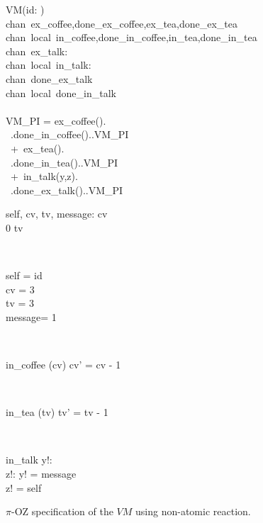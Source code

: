 \begin{figure}[H]
\centering
\begin{class}{VM(id: \integer)}
\ 
\\chan\ ex\_coffee,done\_ex\_coffee,ex\_tea,done\_ex\_tea
\ 
\\chan\ local\ in\_coffee,done\_in\_coffee,in\_tea,done\_in\_tea
\ 
\\chan\ ex\_talk:\integer \times \integer
\ 
\\chan\ local\ in\_talk:\integer \times \integer
\ 
\\chan\ done\_ex\_talk
\ 
\\chan\ local\ done\_in\_talk
\ \\ \
\\VM\_PI = ex\_coffee().
\\ \ \qquad \qquad \qquad .done\_in\_coffee()..VM\_PI 
\\ \ \qquad \qquad +\ ex\_tea().
\\ \ \qquad \qquad \qquad .done\_in\_tea()..VM\_PI 
\\ \ \qquad \qquad +\ in\_talk(y,z).
\\ \ \qquad \qquad \qquad .done\_ex\_talk()..VM\_PI
\\
\begin{state}
self, cv, tv, message: \integer
\ST
0 \leq  cv \leq 3
\\
0 \leq  tv \leq 3
\end{state} 
\\
\begin{init}
self = id
\\cv = 3
\\tv = 3
\\ message= 1
\end{init} 
\\
\begin{op}{in\_coffee}
\Delta (cv)
\ST
cv' = cv - 1
\end{op}
\\
\begin{op}{in\_tea}
\Delta (tv)
\ST
tv' = tv - 1
\end{op}
\\
\begin{op}{in\_talk}
y!: \integer
\\z!: \integer
\ST
y! = message
\\z! = self
\end{op}
\end{class}
\caption{$\pi$-OZ specification of the $VM$ using non-atomic reaction.}
\label{comp_oz_pi_statefull_vm_non_atomic}
\end{figure}